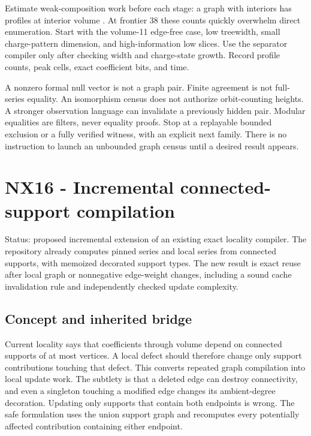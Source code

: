 \documentclass[
  11pt,
  a4paper,
]{report}
\let\nxtexttt\texttt
\renewcommand{\texttt}[1]{\nxtexttt{\seqsplit{#1}}}
\begin{document}
Estimate weak-composition work before each stage: a graph with
\texttt{m} interiors has \texttt{binom(j+m-1,m-1)} profiles at interior
volume \texttt{j}. At frontier 38 these counts quickly overwhelm direct
enumeration. Start with the volume-11 edge-free case, low treewidth,
small charge-pattern dimension, and high-information low slices. Use the
separator compiler only after checking width and charge-state growth.
Record profile counts, peak cells, exact coefficient bits, and time.

A nonzero formal null vector is not a graph pair. Finite agreement is
not full-series equality. An isomorphism census does not authorize
orbit-counting heights. A stronger observation language can invalidate a
previously hidden pair. Modular equalities are filters, never equality
proofs. Stop at a replayable bounded exclusion or a fully verified
witness, with an explicit next family. There is no instruction to launch
an unbounded graph census until a desired result appears.

\hypertarget{nx16---incremental-connected-support-compilation}{%
\chapter{NX16 - Incremental connected-support
compilation}\label{nx16---incremental-connected-support-compilation}}

Status: proposed incremental extension of an existing exact locality
compiler. The repository already computes pinned series and local series
from connected supports, with memoized decorated support types. The new
result is exact reuse after local graph or nonnegative edge-weight
changes, including a sound cache invalidation rule and independently
checked update complexity.

\hypertarget{concept-and-inherited-bridge}{%
\section{Concept and inherited
bridge}\label{concept-and-inherited-bridge}}

Current locality says that coefficients through volume \texttt{R} depend
on connected supports of at most \texttt{R} vertices. A local defect
should therefore change only support contributions touching that defect.
This converts repeated graph compilation into local update work. The
subtlety is that a deleted edge can destroy connectivity, and even a
singleton touching a modified edge changes its ambient-degree
decoration. Updating only supports that contain both endpoints is wrong.
The safe formulation uses the union support graph and recomputes every
potentially affected contribution containing either endpoint.
\end{document}
